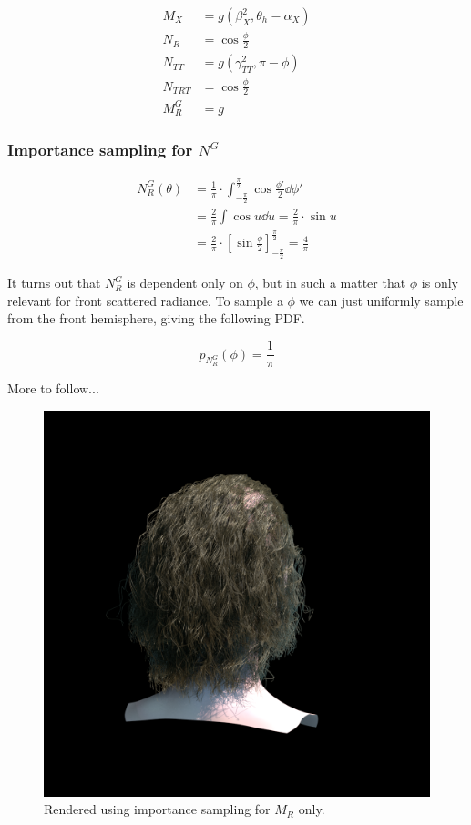 \documentclass[12pt,a4paper,twoside]{article}
\begin{document}
\begin{align*}
M_X & = g(\beta_X^2, \theta_h - \alpha_X) \\
N_R & = \cos\frac{\phi}{2} \\
N_{TT} & = g(\gamma_{TT}^2, \pi - \phi) \\
N_{TRT} & = \cos\frac{\phi}{2} \\
M_R^G & = g
\end{align*}


\subsubsection*{Importance sampling for $N^G$}

\begin{equation}
\begin{split}
N_R^G(\theta) & = \frac{1}{\pi} \cdot \int_{-\frac{\pi}{2}}^{\frac{\pi}{2}} \cos \frac{\phi'}{2} \dd{\phi'} \\
 & = \frac{2}{\pi} \int \cos u \dd{u}  = \frac{2}{\pi} \cdot \sin u \\
 & = \frac{2}{\pi} \cdot \left[\sin \frac{\phi}{2}\right]_{-\frac{\pi}{2}}^{\frac{\pi}{2}} = \frac{4}{\pi}
\end{split}
\end{equation}

It turns out that $N_R^G$ is dependent only on $\phi$, but in such a matter that $\phi$ is only relevant for front scattered radiance. To sample a $\phi$ we can just uniformly sample from the front hemisphere, giving the following PDF.

\begin{equation}
p_{N^G_R}(\phi) = \frac{1}{\pi}
\end{equation}

More to follow...

\begin{figure}
  \includegraphics[width=\linewidth]{curly_blonde_dualscattering.png}
  \caption{Rendered using importance sampling for $M_R$ only.}
  \label{fig:dualscattering:blonde:MR}
\end{figure}




 
\end{document}
